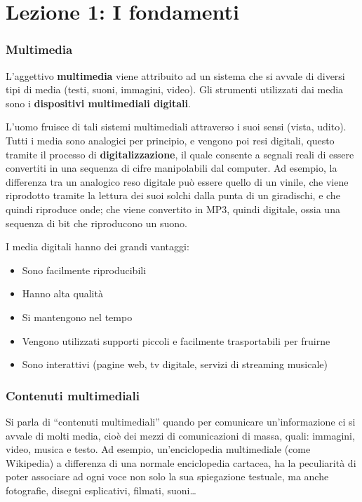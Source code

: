 \documentclass[
]{article}
\author{}
\date{}
\providecommand{\tightlist}{%
  \setlength{\itemsep}{0pt}\setlength{\parskip}{0pt}}
\begin{document}
\hypertarget{lezione-1-i-fondamenti}{%
\section{Lezione 1: I fondamenti}\label{lezione-1-i-fondamenti}}

\hypertarget{multimedia}{%
\subsubsection{Multimedia}\label{multimedia}}

L'aggettivo \textbf{multimedia} viene attribuito ad un sistema che si avvale di diversi tipi di media (testi, suoni, immagini, video). Gli strumenti utilizzati dai media sono i \textbf{dispositivi multimediali digitali}.

L'uomo fruisce di tali sistemi multimediali attraverso i suoi sensi (vista, udito). Tutti i media sono analogici per principio, e vengono poi resi digitali, questo tramite il processo di \textbf{digitalizzazione}, il quale consente a segnali reali di essere convertiti in una sequenza di cifre manipolabili dal computer. Ad esempio, la differenza tra un analogico reso digitale può essere quello di un vinile, che viene riprodotto tramite la lettura dei suoi solchi dalla punta di un giradischi, e che quindi riproduce onde; che viene convertito in MP3, quindi digitale, ossia una sequenza di bit che riproducono un suono.

I media digitali hanno dei grandi vantaggi:

\begin{itemize}
\tightlist
\item
  Sono facilmente riproducibili
\item
  Hanno alta qualità
\item
  Si mantengono nel tempo
\item
  Vengono utilizzati supporti piccoli e facilmente trasportabili per fruirne
\item
  Sono interattivi (pagine web, tv digitale, servizi di streaming musicale)
\end{itemize}

\hypertarget{contenuti-multimediali}{%
\subsubsection{Contenuti multimediali}\label{contenuti-multimediali}}

Si parla di ``contenuti multimediali'' quando per comunicare un'informazione ci si avvale di molti media, cioè dei mezzi di comunicazioni di massa, quali: immagini, video, musica e testo. Ad esempio, un'enciclopedia multimediale (come Wikipedia) a differenza di una normale enciclopedia cartacea, ha la peculiarità di poter associare ad ogni voce non solo la sua spiegazione testuale, ma anche fotografie, disegni esplicativi, filmati, suoni\ldots{}
\end{document}
